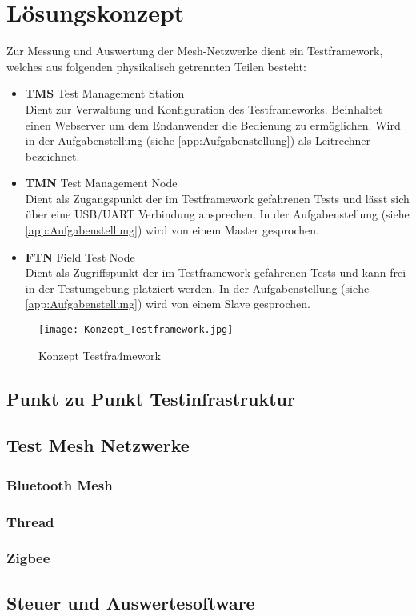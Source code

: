 \clearpage
\section{Lösungskonzept}\label{sec:Loesungskonzept}

Zur Messung und Auswertung der Mesh-Netzwerke dient ein Testframework, welches aus folgenden physikalisch getrennten Teilen besteht:

\begin{itemize}
	\item \textbf{TMS} Test Management Station \\ 
	Dient zur Verwaltung und Konfiguration des Testframeworks. Beinhaltet einen Webserver um dem Endanwender die Bedienung zu ermöglichen. Wird in der Aufgabenstellung (siehe \ref{app:Aufgabenstellung}) als Leitrechner bezeichnet. 
	\item \textbf{TMN} Test Management Node \\ 
	Dient als Zugangspunkt der im Testframework gefahrenen Tests und lässt sich über eine USB/UART Verbindung ansprechen. In der Aufgabenstellung (siehe \ref{app:Aufgabenstellung}) wird von einem Master gesprochen. 
	\item \textbf{FTN} Field Test Node \\ 
	Dient als Zugriffspunkt der im Testframework gefahrenen Tests und kann frei in der Testumgebung platziert werden. In der Aufgabenstellung (siehe \ref{app:Aufgabenstellung}) wird von einem Slave gesprochen. 
\end{itemize}

\begin{figure}[H]
	\centering
	\texttt{[image: Konzept\_Testframework.jpg]}
	\caption{Konzept Testfra4mework}\label{fig:KonzeptTestframework}
\end{figure}

\subsection{Punkt zu Punkt Testinfrastruktur}\label{subsec:PunktzuPunktTestinfrastruktur}


\subsection{Test Mesh Netzwerke}\label{subsec:TestMeshNetzwerke}

\subsubsection{Bluetooth Mesh}\label{subsubsection:Bluetooth Mesh}

\subsubsection{Thread}\label{subsubsection:Thread} 

\subsubsection{Zigbee}\label{subsubsection:Zigbee}


\subsection{Steuer und Auswertesoftware}\label{subsec:SteuerundAuswertesoftware}

